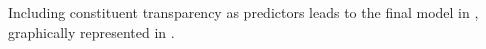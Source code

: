 Including constituent transparency as predictors leads to the final
model in , graphically represented in
.
